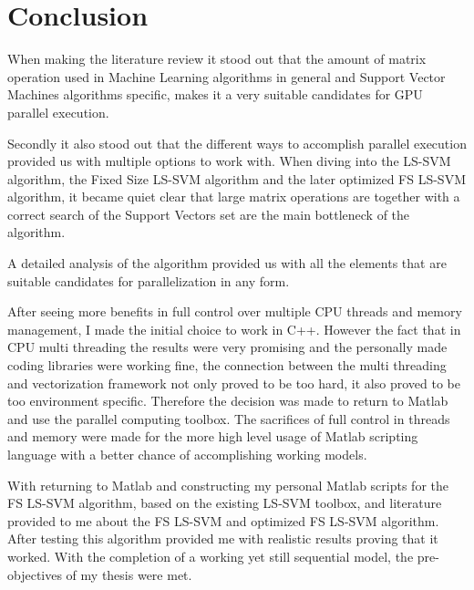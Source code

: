 
\chapter{Conclusion}
When making the literature review it stood out that the amount of matrix operation used in Machine Learning algorithms in general and Support Vector Machines algorithms specific, makes it a very suitable candidates for GPU parallel execution.\par 
Secondly it also stood out that the different ways to accomplish parallel execution provided us with multiple options to work with.
When diving into the LS-SVM algorithm, the Fixed Size LS-SVM algorithm and the later optimized FS LS-SVM algorithm, it became quiet clear that large matrix operations are together with a correct search of the Support Vectors set are the main bottleneck of the algorithm.\par
A detailed analysis of the algorithm provided us with all the elements that are suitable candidates for parallelization in any form.
\par
After seeing more benefits in full control over multiple CPU threads and memory management, I made the initial choice to work in C++.
However the fact that in CPU multi threading the results were very promising and the personally made coding libraries were working fine, the connection between the multi threading and vectorization framework not only proved to be too hard, it also proved to be too environment specific.
Therefore the decision was made to return to Matlab and use the parallel computing toolbox.
The sacrifices of full control in threads and memory were made for the more high level usage of Matlab scripting language with a better chance of accomplishing working models.
\par
With returning to Matlab and constructing my personal Matlab scripts for the FS LS-SVM algorithm, based on the existing LS-SVM toolbox, and literature provided to me about the FS LS-SVM and optimized FS LS-SVM algorithm.
After testing this algorithm provided me with realistic results proving that it worked.
With the completion of a working yet still sequential model, the pre-objectives of my thesis were met.
